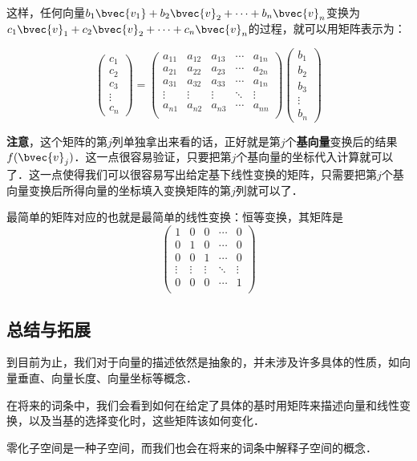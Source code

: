 这样，任何向量$b_1\bvec{v_1}+b_2\bvec{v}_2+\cdots+b_n\bvec{v}_n$变换为$c_1\bvec{v}_1+c_2\bvec{v}_2+\cdots+c_n\bvec{v}_n$的过程，就可以用矩阵表示为：

\begin{equation}
\begin{pmatrix}
c_1\\c_2\\c_3\\\vdots\\c_n
\end{pmatrix}
=
    \begin{pmatrix}
    a_{11}&a_{12}&a_{13}&\cdots&a_{1n}\\
    a_{21}&a_{22}&a_{23}&\cdots&a_{2n}\\
    a_{31}&a_{32}&a_{33}&\cdots&a_{1n}\\
    \vdots&\vdots&\vdots&\ddots&\vdots\\
    a_{n1}&a_{n2}&a_{n3}&\cdots&a_{nn}\\
    \end{pmatrix}
    \begin{pmatrix}
    b_1\\b_2\\b_3\\\vdots\\b_n
    \end{pmatrix}
\end{equation}

\textbf{注意}，这个矩阵的第$j$列单独拿出来看的话，正好就是第$j$个\textbf{基向量}变换后的结果$f(\bvec{v}_j)$．这一点很容易验证，只要把第$j$个基向量的坐标代入计算就可以了．这一点使得我们可以很容易写出给定基下线性变换的矩阵，只需要把第$j$个基向量变换后所得向量的坐标填入变换矩阵的第$j$列就可以了．

最简单的矩阵对应的也就是最简单的线性变换：恒等变换，其矩阵是
\begin{equation}
    \begin{pmatrix}
1&0&0&\cdots&0\\
0&1&0&\cdots&0\\
0&0&1&\cdots&0\\
\vdots&\vdots&\vdots&\ddots&\vdots\\
0&0&0&\cdots&1\\
    \end{pmatrix}
\end{equation}


\subsection{总结与拓展}

到目前为止，我们对于向量的描述依然是抽象的，并未涉及许多具体的性质，如向量垂直、向量长度、向量坐标等概念．

在将来的词条中，我们会看到如何在给定了具体的基时用矩阵来描述向量和线性变换，以及当基的选择变化时，这些矩阵该如何变化．

零化子空间是一种子空间，而我们也会在将来的词条中解释子空间的概念．
